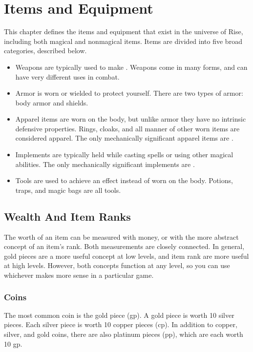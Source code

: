 \chapter{Items and Equipment}

This chapter defines the items and equipment that exist in the universe of Rise, including both magical and nonmagical items.
Items are divided into five broad categories, described below.
\begin{itemize}
    \item Weapons are typically used to make .
        Weapons come in many forms, and can have very different uses in combat.
    \item Armor is worn or wielded to protect yourself.
        There are two types of armor: body armor and shields.
    \item Apparel items are worn on the body, but unlike armor they have no intrinsic defensive properties.
        Rings, cloaks, and all manner of other worn items are considered apparel.
        The only mechanically significant apparel items are \magical.
    \item Implements are typically held while casting spells or using other magical abilities.
        The only mechanically significant implements are \magical.
    \item Tools are used to achieve an effect instead of worn on the body.
        Potions, traps, and magic bags are all tools.
\end{itemize}

\section{Wealth And Item Ranks}\label{Wealth}\label{Wealth and Item Ranks}

    The worth of an item can be measured with money, or with the more abstract concept of an item's rank.
    Both measurements are closely connected.
    In general, gold pieces are a more useful concept at low levels, and item rank are more useful at high levels.
    However, both concepts function at any level, so you can use whichever makes more sense in a particular game.

    \subsection{Coins}
        The most common coin is the gold piece (gp). A gold piece is worth 10 silver pieces. Each silver piece is worth 10 copper pieces (cp). In addition to copper, silver, and gold coins, there are also platinum pieces (pp), which are each worth 10 gp.

